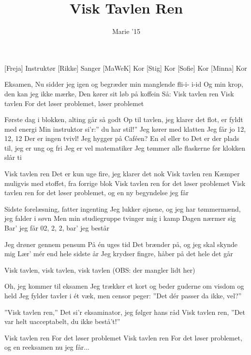 \documentclass[a4paper,11pt]{article}
\title{Visk Tavlen Ren}
\author{Marie '15}
\begin{document}
\maketitle

\begin{roles}
[Freja] Instruktør
[Rikke] Sanger
[MaWeK] Kor
[Stig] Kor
[Sofie] Kor
[Minna] Kor
\end{roles}

\begin{song}
 Eksamen,
Nu sidder jeg igen og begræder
min manglende fli-i- i-id
Og min krop, den kan jeg ikke mærke,
Den kører sit løb på koffein
Så: 
 Visk tavlen ren
Visk tavlen
 For det
 løser problemet, løser problemet

 Første dag i blokken, alting går så godt
Op til tavlen, jeg klarer det flot, er fyldt med energi
Min instruktor si’r:” du har stil!”
Jeg kører med klatten
Jeg får jo 12, 12, 12
Der er ingen tvivl!
Jeg hygger på Caféen?
En øl eller to
Det er der plads til, jeg er ung og fri
Jeg er vel matematiker
Jeg tømmer alle 
 flaskerne før klokken slår ti

 Visk tavlen ren
 Det er kun uge fire, jeg klarer det nok
 Visk tavlen ren
 Kæmper muligvis med stoffet, fra forrige blok
 Visk tavlen ren 
 for det løser problemet
 Visk tavlen ren 
 for det løser problemet, og en ny begyndelse jeg får

 Sidste forelæsning, fatter ingenting
Jeg lukker øjnene, og jeg har tømmermænd, jeg falder i søvn
Men min studiegruppe tvinger mig i kamp
Dagen nærmer sig
Bar’ jeg får 
 02, 2, 2, bar’ jeg består

 Jeg drøner gennem pensum
På én uges tid
Det brænder på, og jeg skal skynde mig
Lær’ mér end hele sidste år
Jeg krydser fingre, 
 håber på det hele det går

 Visk tavlen, visk tavlen, visk tavlen (OBS: der mangler lidt her)


 Oh, jeg kommer til eksamen
Jeg trækker et kort og beder guderne om visdom og held
Jeg fylder tavler i ét væk, men censor peger:
 ”Det dér passer da ikke, vel?”

 ”Visk tavlen ren,”
 Det si’r eksaminator, jeg følger hans råd
 Visk tavlen ren,
 ”Det var helt uacceptabelt, du ikke bestå’t!”

 Visk tavlen ren 
 For det løser problemet
Visk tavlen ren
 For det løser problemet, og 
 en reeksamen nu jeg får...

\end{song}
\end{document}

